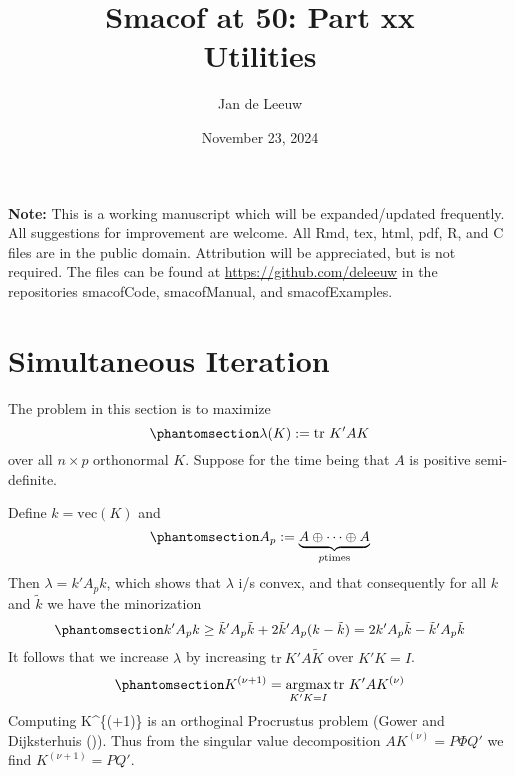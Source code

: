 \documentclass[
  12pt,
  letterpaper,
  DIV=11,
  numbers=noendperiod]{scrartcl}
\title{Smacof at 50: Part xx\\
Utilities}
\author{Jan de Leeuw}
\date{November 23, 2024}
\newcommand{\sectionbreak}{\clearpage}
\renewcommand*\contentsname{Table of contents}
\newcommand\contentsname{Table of contents}
\begin{document}
\maketitle

\renewcommand*\contentsname{Table of contents}
{
\hypersetup{linkcolor=}
\setcounter{tocdepth}{3}
\tableofcontents
}

\textbf{Note:} This is a working manuscript which will be
expanded/updated frequently. All suggestions for improvement are
welcome. All Rmd, tex, html, pdf, R, and C files are in the public
domain. Attribution will be appreciated, but is not required. The files
can be found at \url{https://github.com/deleeuw} in the repositories
smacofCode, smacofManual, and smacofExamples.

\sectionbreak

\section{Simultaneous Iteration}\label{sec-simit}

The problem in this section is to maximize
\begin{equation}\phantomsection\label{eq-lbddef}{
\lambda(K):=\text{tr}\ K'AK
}\end{equation} over all \(n\times p\) orthonormal \(K\). Suppose for
the time being that \(A\) is positive semi-definite.

Define \(k=\text{vec}(K)\) and
\begin{equation}\phantomsection\label{eq-apdef}{
A_p:=\underbrace{A\oplus\cdots\oplus A}_{p \text{times}}
}\end{equation} Then \(\lambda=k'A_pk\), which shows that \(\lambda\)
i/s convex, and that consequently for all \(k\) and \(\tilde k\) we have
the minorization \begin{equation}\phantomsection\label{eq-kmaj}{
k'A_pk\geq \tilde k'A_p\tilde k+2\tilde k'A_p(k-\tilde k)=2k'A_p\tilde k-\tilde k'A_p\tilde k
}\end{equation} It follows that we increase \(\lambda\) by increasing
\(\text{tr}\ K'A\tilde K\) over \(K'K=I\).
\begin{equation}\phantomsection\label{eq-kupd}{
K^{(\nu+1)}=\mathop{\text{argmax}}_{K'K=I}\text{tr}\ K'AK^{(\nu)}
}\end{equation} Computing K\^{}\{(\nu+1)\} is an orthoginal Procrustus
problem (Gower and Dijksterhuis
()). Thus from the singular
value decomposition \(AK^{(\nu)}=P\Phi Q'\) we find \(K^{(\nu+1)}=PQ'\).
\end{document}
